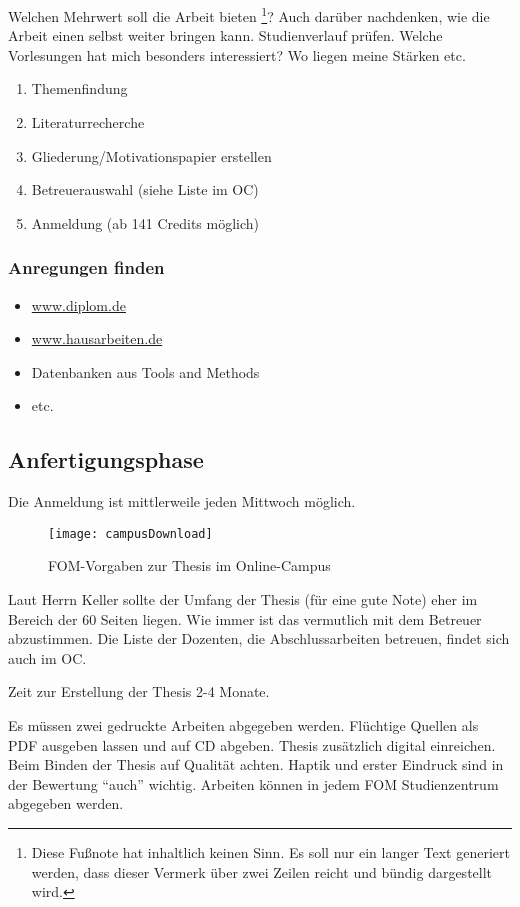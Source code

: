 Welchen Mehrwert soll die Arbeit bieten \footnote{Diese Fu\ss note hat inhaltlich keinen Sinn. Es soll nur ein langer Text generiert werden, dass dieser Vermerk über zwei Zeilen reicht und bündig dargestellt wird.}? Auch darüber nachdenken, wie die Arbeit einen selbst weiter bringen kann. Studienverlauf prüfen. Welche Vorlesungen hat mich besonders interessiert? Wo liegen meine Stärken etc.

\begin{enumerate}
\item Themenfindung
\item Literaturrecherche
\item Gliederung/Motivationspapier erstellen
\item Betreuerauswahl (siehe Liste im \ac{OC})
\item Anmeldung (ab 141 Credits möglich)
\end{enumerate}

\subsubsection{Anregungen finden}
\begin{itemize}
\item \href{http://www.diplom.de}{www.diplom.de}
\item \href{http://www.hausarbeiten.de}{www.hausarbeiten.de}
\item Datenbanken aus Tools and Methods
\item etc.
\end{itemize}

\newpage
\subsection{Anfertigungsphase}
Die Anmeldung ist mittlerweile jeden Mittwoch möglich.
\begin{figure}[H]
\caption{FOM-Vorgaben zur Thesis im Online-Campus}
\texttt{[image: campusDownload]}
\\
\cite[Quelle: Vgl.][]{FOM}
\end{figure}

Laut Herrn Keller sollte der Umfang der Thesis (für eine gute Note) eher im Bereich der 60 Seiten liegen. Wie immer ist das vermutlich mit dem Betreuer abzustimmen. Die Liste der Dozenten, die Abschlussarbeiten betreuen, findet sich auch im \ac{OC}.

Zeit zur Erstellung der Thesis 2-4 Monate.

Es müssen zwei gedruckte Arbeiten abgegeben werden. Flüchtige Quellen als PDF ausgeben lassen und auf CD abgeben. Thesis zusätzlich digital einreichen. Beim Binden der Thesis auf Qualität achten. Haptik und erster Eindruck sind in der Bewertung \enquote{auch} wichtig. Arbeiten können in jedem FOM Studienzentrum abgegeben werden.

